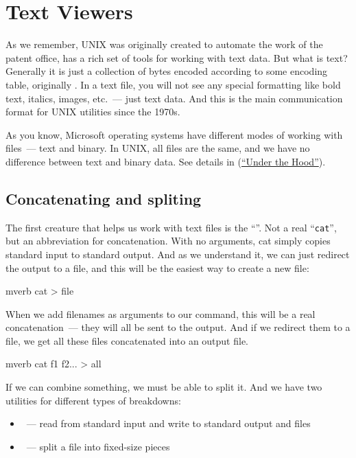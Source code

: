\section*{Text Viewers}

As we remember, UNIX was originally created to automate the work of
the patent office, has a rich set of tools for working with text data.
But what is text? Generally it is just a collection of bytes encoded
according to some encoding table, originally . In a text file,
you will not see any special formatting like bold text, italics, images,
etc.~--- just text data. And this is the main communication format
for UNIX utilities since the 1970s.

As you know, Microsoft operating systems have different modes of working
with files~--- text and binary. In UNIX, all files are the same, and
we have no difference between text and binary data. See details in
(\href{under_the_hood/pipelining_Windows.txt}{``Under the Hood''}).

\subsection*{Concatenating and spliting}

The first creature that helps us work with text files is the ``''.
Not a real ``{\tt cat}'', but an abbreviation for concatenation. With no arguments,
cat simply copies standard input to standard output. And as we understand it,
we can just redirect the output to a file, and this will be the easiest way
to create a new file:
\begin{code}{mverb}
cat > file
\end{code}
When we add filenames as arguments to our command, this will be a real
concatenation~--- they will all be sent to the output. And if we redirect them
to a file, we get all these files concatenated into an output file.
\begin{code}{mverb}
cat f1 f2... > all
\end{code}

If we can combine something, we must be able to split it.
And we have two utilities for different types of breakdowns:
\begin{itemize}
\item {}~--- read from standard input and write to standard output and
      files
\item {}~--- split a file into fixed-size pieces
\end{itemize}

